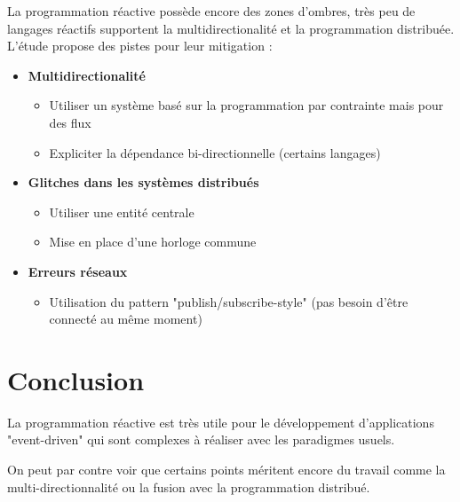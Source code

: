 \documentclass[10pt,final]{IEEEtran}
\begin{document}
La programmation réactive possède encore des zones d'ombres, très peu de langages réactifs
supportent la multidirectionalité et la programmation distribuée. L'étude propose des pistes pour leur mitigation :
\begin{itemize}
    \item \textbf{Multidirectionalité}
        \begin{itemize}
            \item Utiliser un système basé sur la programmation par contrainte mais pour des flux
            \item Expliciter la dépendance bi-directionnelle (certains langages)
        \end{itemize}
    \item \textbf{Glitches dans les systèmes distribués}
        \begin{itemize}
            \item Utiliser une entité centrale
            \item Mise en place d'une horloge commune
        \end{itemize}
    \item \textbf{Erreurs réseaux}
        \begin{itemize}
            \item Utilisation du pattern "publish/subscribe-style" (pas besoin d'être connecté au même moment)
        \end{itemize}
\end{itemize}

\section{Conclusion}

La programmation réactive est très utile pour le développement d'applications "event-driven" qui
sont complexes à réaliser avec les paradigmes usuels.


On peut par contre voir que certains points méritent encore du travail comme la
multi-directionnalité ou la fusion avec la programmation distribué.
\end{document}
